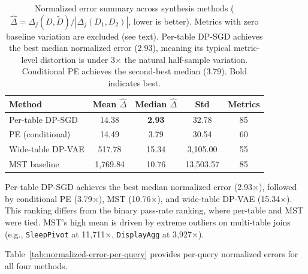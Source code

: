 \documentclass[12pt,letterpaper]{article}
\renewcommand{\_}{\textunderscore\allowbreak}
\begin{document}
\begin{table}[H]
\centering
\begin{tabular*}{\textwidth}{@{\extracolsep{\fill}}lcccc}
\toprule
\textbf{Method} & \textbf{Mean $\hat{\Delta}$} & \textbf{Median $\hat{\Delta}$} & \textbf{Std} & \textbf{Metrics} \\
\midrule
Per-table DP-SGD & 14.38 & \textbf{2.93} & 32.78 & 85 \\
PE (conditional) & 14.49 & 3.79 & 30.54 & 60 \\
Wide-table DP-VAE & 517.78 & 15.34 & 3{,}105.00 & 55 \\
MST baseline & 1{,}769.84 & 10.76 & 13{,}503.57 & 85 \\
\bottomrule
\end{tabular*}
\caption{Normalized error summary across synthesis methods ($\hat{\Delta} = \Delta_j(D, \tilde{D}) / |\Delta_j(D_1, D_2)|$, lower is better). Metrics with zero baseline variation are excluded (see text). Per-table DP-SGD achieves the best median normalized error (2.93), meaning its typical metric-level distortion is under 3$\times$ the natural half-sample variation. Conditional PE achieves the second-best median (3.79). Bold indicates best.}
\label{tab:normalized-error}
\end{table}

Per-table DP-SGD achieves the best median normalized error (2.93$\times$), followed by conditional PE (3.79$\times$), MST (10.76$\times$), and wide-table DP-VAE (15.34$\times$). This ranking differs from the binary pass-rate ranking, where per-table and MST were tied. MST's high mean is driven by extreme outliers on multi-table joins (e.g., \texttt{SleepPivot} at 11{,}711$\times$, \texttt{DisplayAgg} at 3{,}927$\times$).

Table~\ref{tab:normalized-error-per-query} provides per-query normalized errors for all four methods.
\end{document}
